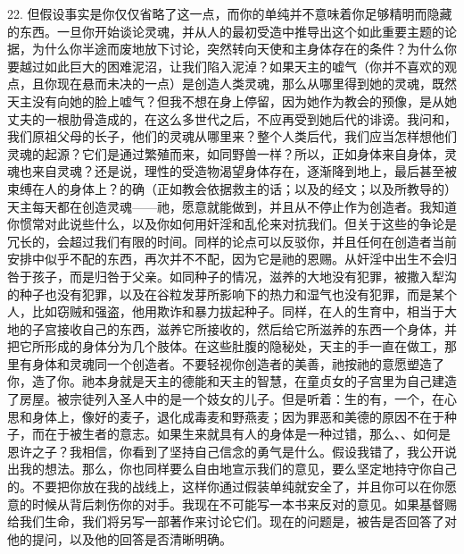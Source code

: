 22. 但假设事实是你仅仅省略了这一点，而你的单纯并不意味着你足够精明而隐藏的东西。一旦你开始谈论灵魂，并从人的最初受造中推导出这个如此重要主题的论据，为什么你半途而废地放下讨论，突然转向天使和主身体存在的条件？为什么你要越过如此巨大的困难泥沼，让我们陷入泥淖？如果天主的嘘气（你并不喜欢的观点，且你现在悬而未决的一点）是创造人类灵魂，那么从哪里得到她的灵魂，既然天主没有向她的脸上嘘气？但我不想在身上停留，因为她作为教会的预像，是从她丈夫的一根肋骨造成的，在这么多世代之后，不应再受到她后代的诽谤。我问和，我们原祖父母的长子，他们的灵魂从哪里来？整个人类后代，我们应当怎样想他们灵魂的起源？它们是通过繁殖而来，如同野兽一样？所以，正如身体来自身体，灵魂也来自灵魂？还是说，理性的受造物渴望身体存在，逐渐降到地上，最后甚至被束缚在人的身体上？的确（正如教会依据救主的话；以及的经文；以及所教导的）天主每天都在创造灵魂——祂，愿意就能做到，并且从不停止作为创造者。我知道你惯常对此说些什么，以及你如何用奸淫和乱伦来对抗我们。但关于这些的争论是冗长的，会超过我们有限的时间。同样的论点可以反驳你，并且任何在创造者当前安排中似乎不配的东西，再次并不不配，因为它是祂的恩赐。从奸淫中出生不会归咎于孩子，而是归咎于父亲。如同种子的情况，滋养的大地没有犯罪，被撒入犁沟的种子也没有犯罪，以及在谷粒发芽所影响下的热力和湿气也没有犯罪，而是某个人，比如窃贼和强盗，他用欺诈和暴力拔起种子。同样，在人的生育中，相当于大地的子宫接收自己的东西，滋养它所接收的，然后给它所滋养的东西一个身体，并把它所形成的身体分为几个肢体。在这些肚腹的隐秘处，天主的手一直在做工，那里有身体和灵魂同一个创造者。不要轻视你创造者的美善，祂按祂的意愿塑造了你，造了你。祂本身就是天主的德能和天主的智慧，在童贞女的子宫里为自己建造了房屋。被宗徒列入圣人中的是一个妓女的儿子。但是听着：生的有，一个，在心思和身体上，像好的麦子，退化成毒麦和野燕麦；因为罪恶和美德的原因不在于种子，而在于被生者的意志。如果生来就具有人的身体是一种过错，那么、、如何是恩许之子？我相信，你看到了坚持自己信念的勇气是什么。假设我错了，我公开说出我的想法。那么，你也同样要么自由地宣示我们的意见，要么坚定地持守你自己的。不要把你放在我的战线上，这样你通过假装单纯就安全了，并且你可以在你愿意的时候从背后刺伤你的对手。我现在不可能写一本书来反对的意见。如果基督赐给我们生命，我们将另写一部著作来讨论它们。现在的问题是，被告是否回答了对他的提问，以及他的回答是否清晰明确。\par

